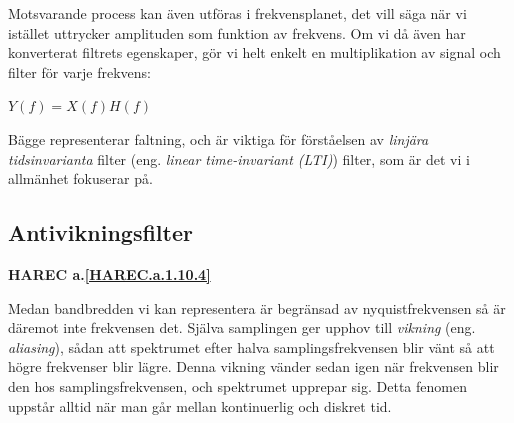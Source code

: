 Motsvarande process kan även utföras i frekvensplanet, det vill säga när vi 
istället uttrycker amplituden som funktion av frekvens.
Om vi då även har konverterat filtrets egenskaper, gör vi helt enkelt en
multiplikation av signal och filter för varje frekvens:

\(Y(f) = X(f)H(f)\)

Bägge representerar faltning, och är viktiga för förståelsen av \emph{linjära
tidsinvarianta} filter (eng. \emph{linear time-invariant (LTI)}) filter,
som är det vi i allmänhet fokuserar på.

\subsection{Antivikningsfilter}
\textbf{HAREC a.\ref{HAREC.a.1.10.4}\label{myHAREC.a.1.10.4}}

Medan bandbredden vi kan representera är begränsad av nyquistfrekvensen så
är däremot inte frekvensen det.
Själva samplingen ger upphov till \emph{vikning} (eng. \emph{aliasing}),
sådan att spektrumet efter halva samplingsfrekvensen blir vänt så att högre
frekvenser blir lägre.
Denna vikning vänder sedan igen när frekvensen blir den hos
samplingsfrekvensen, och spektrumet upprepar sig.
Detta fenomen uppstår alltid när man går mellan kontinuerlig och diskret tid.

